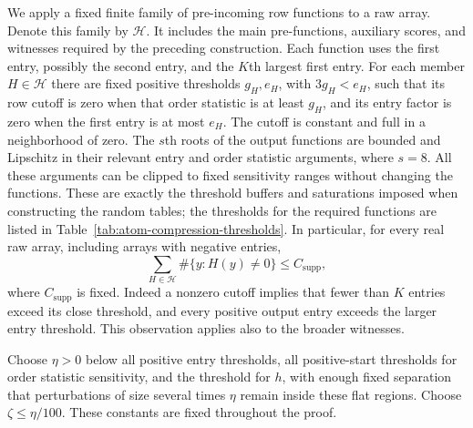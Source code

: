 We apply a fixed finite family of pre-incoming row functions to a raw array.
Denote this family by $\mathcal H$.  It includes the main pre-functions,
auxiliary scores, and witnesses required by the preceding construction.
Each function uses the first entry, possibly the second entry, and the
$K$th largest first entry.  For each member $H\in\mathcal H$ there are fixed
positive thresholds $g_H,e_H$, with $3g_H<e_H$, such that its row cutoff is
zero when that order statistic is at least $g_H$, and its entry factor is zero when the
first entry is at most $e_H$.  The cutoff is constant and full in a neighborhood
of zero.  The $s$th roots of the output functions are bounded and Lipschitz
in their relevant entry and order statistic arguments, where $s=8$.  All these arguments
can be clipped to fixed sensitivity ranges without changing the functions.
These are exactly the threshold buffers and saturations imposed when
constructing the random tables; the thresholds for the required functions are
listed in Table~\ref{tab:atom-compression-thresholds}.  In particular,
for every real raw array, including
arrays with negative entries,
\begin{equation}
 \sum_{H\in\mathcal H}\#\{y:H(y)\ne0\}\leq C_{\mathrm{supp}},
 \label{eq:buf-row-support}
\end{equation}
where $C_{\mathrm{supp}}$ is fixed.  Indeed a nonzero cutoff implies that fewer
than $K$ entries exceed its close threshold, and every positive output entry
exceeds the larger entry threshold.  This observation applies also to the
broader witnesses.

Choose $\eta>0$ below all positive entry thresholds, all positive-start
thresholds for order statistic sensitivity, and the threshold for $h$, with enough
fixed separation that perturbations of size several times $\eta$ remain
inside these flat regions.  Choose $\zeta\leq\eta/100$.  These constants are
fixed throughout the proof.

